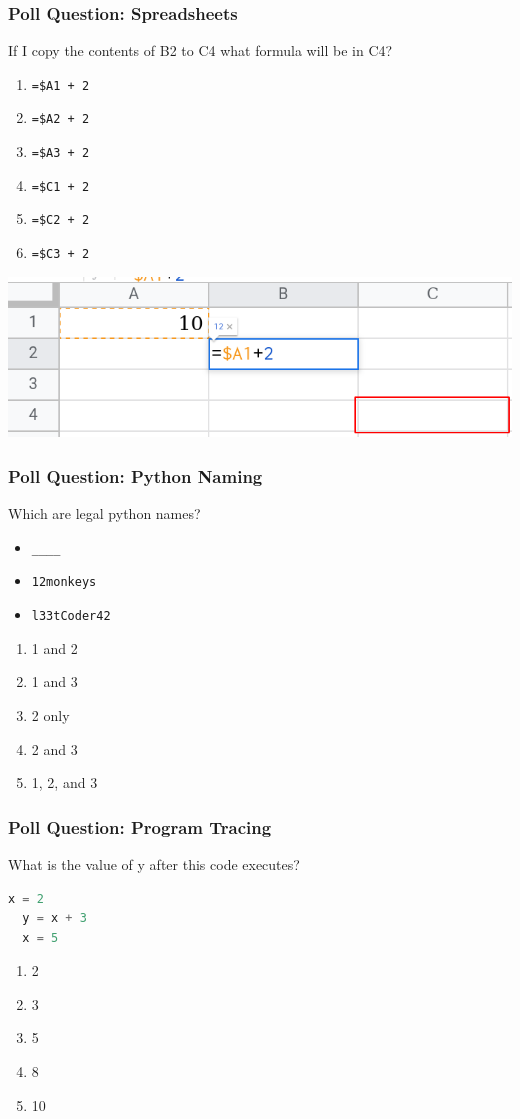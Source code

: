 \documentclass{beamer}
\begin{document}
%
%
%
\begin{frame}[fragile]
  \frametitle{Poll Question: Spreadsheets}
  If I copy the contents of B2 to C4 what formula will be in C4?
  \vfill
  \begin{minipage}{.3\textwidth}
    \begin{enumerate}
      \item \lstinline{=$A1 + 2}
      \item \lstinline{=$A2 + 2}
      \item \lstinline{=$A3 + 2}
      \item \lstinline{=$C1 + 2}
      \item \lstinline{=$C2 + 2}
      \item \lstinline{=$C3 + 2}
    \end{enumerate}
  \end{minipage}
  \begin{minipage}{.65\textwidth}
    \includegraphics[width=\textwidth]{./imgs/spreadsheet-slide-1.png}
  \end{minipage}
\end{frame}

%
%
%
\begin{frame}[fragile]
  \frametitle{Poll Question: Python Naming}
  Which are legal python names?
  \begin{itemize}
    \item \lstinline{____}
    \item \lstinline{12monkeys}
    \item \lstinline{l33tCoder42}
  \end{itemize}
  \begin{enumerate}
    \item 1 and 2
    \item 1 and 3
    \item 2 only
    \item 2 and 3
    \item 1, 2, and 3
  \end{enumerate}
\end{frame}


%
%
%
\begin{frame}[fragile]
  \frametitle{Poll Question: Program Tracing}
  What is the value of y after this code executes?
  \begin{lstlisting}[language=Python]
  x = 2
  y = x + 3
  x = 5
  \end{lstlisting}
  \begin{enumerate}
    \item 2
    \item 3
    \item 5
    \item 8
    \item 10
  \end{enumerate}
\end{frame}
\end{document}
